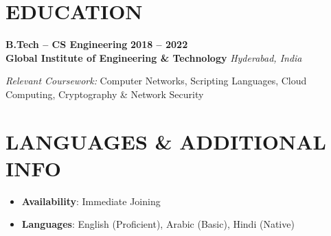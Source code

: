 \documentclass[10pt,a4paper]{article}
\newcommand{\jobheading}[4]{
  \vspace{1.5ex}\noindent
  {\large\textbf{\color{darkteal}#1}} \hfill \textbf{\color{textmain}#2} \\[0.3ex]
  \textbf{\color{textdark}#3} \hfill \textit{\color{textmain}#4} \vspace{0.8ex}
}
\begin{document}
\vspace{-1.5ex}
\section*{EDUCATION}
\jobheading{B.Tech -- CS Engineering}{2018 -- 2022}{Global Institute of Engineering \& Technology}{Hyderabad, India}

\textit{Relevant Coursework:} Computer Networks, Scripting Languages, Cloud Computing, Cryptography \& Network Security

\section*{LANGUAGES \& ADDITIONAL INFO}
\begin{itemize}[label={\color{teal}\textbullet},leftmargin=*,itemsep=5pt,parsep=2pt,topsep=2pt]
    \item \textbf{Availability}: Immediate Joining
    \item \textbf{Languages}: English (Proficient), Arabic (Basic), Hindi (Native)
\end{itemize}
\end{document}

